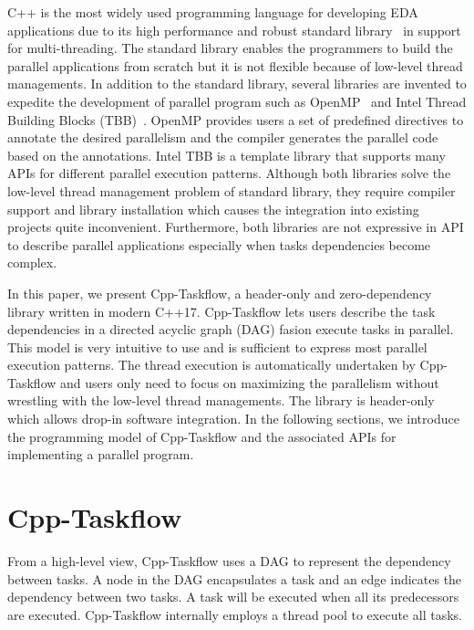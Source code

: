 \documentclass[sigconf]{acmart}
\begin{document}
C++ is the most widely used programming language for developing EDA
applications due to its high performance and robust standard library~\cite{cpp-thread}
in support for multi-threading.
The standard
library enables the programmers to build the parallel applications from scratch 
but it is not flexible because of low-level thread managements.
In addition to the standard library, several libraries are invented to expedite
the development of parallel program such as OpenMP~\cite{openmp} and Intel
Thread Building Blocks (TBB)~\cite{tbb}. OpenMP provides users a set of
predefined directives to annotate the desired parallelism and the compiler generates
the parallel code based on the annotations. Intel TBB is a template library that supports 
many APIs for different parallel execution patterns. Although both libraries 
solve the low-level thread management problem of standard library, they require
compiler support and library installation which causes the integration
into existing projects quite inconvenient. Furthermore, both libraries 
are not expressive in API to describe parallel applications especially
when tasks dependencies become complex.

In this paper, we present Cpp-Taskflow, a header-only and zero-dependency library written in 
modern C++17. Cpp-Taskflow lets users describe the 
task dependencies in a directed acyclic graph (DAG) fasion execute tasks in parallel.
This model is very intuitive to use
and is sufficient to express most parallel execution patterns. 
The thread execution is automatically undertaken by Cpp-Taskflow and users only need to
focus on maximizing the parallelism without wrestling with the low-level thread
managements. The library is header-only which allows drop-in software integration.
In the following sections, we introduce the programming
model of Cpp-Taskflow and the associated APIs for implementing a parallel
program.



\section{Cpp-Taskflow}
From a high-level view, Cpp-Taskflow uses a DAG to represent the dependency
between tasks. A node in the DAG encapsulates a task and an edge
indicates the dependency between two tasks.  A task will be executed when all
its predecessors are executed.  Cpp-Taskflow internally employs a thread pool
to execute all tasks. 
\end{document}
